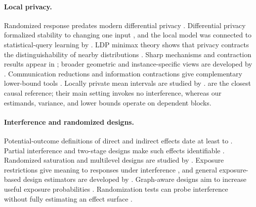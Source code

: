 \documentclass[11pt]{article}
\theoremstyle{definition}
\theoremstyle{remark}
\begin{document}
\paragraph{Local privacy.}
Randomized response predates modern differential privacy \citep{Warner1965}. Differential
privacy formalized stability to changing one input \citep{DworkMcSherryNissimSmith2006}, and
the local model was connected to statistical-query learning by
\citet{KasiviswanathanEtAl2011}. LDP minimax theory shows that privacy contracts the
distinguishability of nearby distributions \citep{DuchiJordanWainwright2013,
DuchiJordanWainwright2018}. Sharp mechanisms and contraction results appear in
\citet{KairouzOhViswanath2016,KairouzBonawitzRamage2016,AsoodehZhang2024}; broader
geometric and instance-specific views are developed by
\citet{RohdeSteinberger2020,DuchiRuan2024}. Communication reductions and information
contractions give complementary lower-bound tools
\citep{DuchiRogers2019,AcharyaCanonneTyagi2020,BarnesHanOzgur2020,Raginsky2016}.
Locally private mean intervals are studied by \citet{GaboardiRogersSheffet2019}.
\citet{OhnishiAwan2025} are the closest causal reference; their main setting invokes no
interference, whereas our estimands, variance, and lower bounds operate on dependent blocks.

\paragraph{Interference and randomized designs.}
Potential-outcome definitions of direct and indirect effects date at least to
\citet{HalloranStruchiner1995}. Partial interference and two-stage designs make such effects
identifiable \citep{Sobel2006,HudgensHalloran2008,TchetgenTchetgenVanderWeele2012,
LiuHudgens2014,BasseFeller2018}. Randomized saturation and multilevel designs are studied by
\citet{SinclairMcConnellGreen2012,BairdBohrenMcIntoshOzler2018}. Exposure restrictions give
meaning to responses under interference \citep{Manski2013}, and general exposure-based
design estimators are developed by \citet{AronowSamii2017}. Graph-aware designs aim to
increase useful exposure probabilities
\citep{UganderKarrerBackstromKleinberg2013,EcklesKarrerUgander2017}. Randomization tests can
probe interference without fully estimating an effect surface
\citep{BowersFredricksonPanagopoulos2013,AtheyEcklesImbens2018}.
\end{document}
